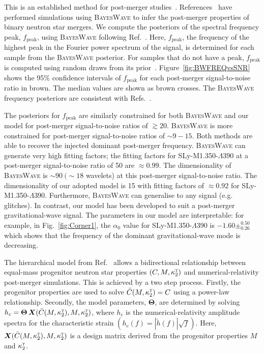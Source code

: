 \documentclass[../Thesis.tex]{subfiles}
\begin{document}
    This is an established method for post-merger studies~\cite{GW170817Properties,GW190425Detection}.
    References~\cite{Chatziioannou2017,Torres-Rivas2019} have performed simulations using \textsc{BayesWave} to infer the post-merger properties of binary neutron star mergers.
    We compute the posteriors of the spectral frequency peak, $f_{\mathrm{peak}}$, using \textsc{BayesWave} following Ref.~\cite{Chatziioannou2017}. Here, $f_{\mathrm{peak}}$, the frequency of the highest peak in the Fourier power spectrum of the signal, is determined for each sample from the \textsc{BayesWave} posterior. 
    For samples that do not have a peak, $f_{\mathrm{peak}}$ is computed using  random draws from its prior~\cite{Chatziioannou2017}.
    Figure~\ref{fig:BWFREQvsSNR} shows the 95\% confidence intervals of $f_{\mathrm{peak}}$ for each post-merger signal-to-noise ratio in brown. The median values are shown as brown crosses.
    The \textsc{BayesWave} frequency posteriors are consistent with Refs.~\cite{Chatziioannou2017,Torres-Rivas2019}.

    The posteriors for $f_{\mathrm{peak}}$ are similarly constrained for both \textsc{BayesWave} and our model for post-merger signal-to-noise ratios of $\gtrsim 20$. 
    \textsc{BayesWave} is more  constrained for post-merger signal-to-noise ratios of $\sim 9 - 15$.
    Both methods are able to recover the injected dominant post-merger frequency.
    \textsc{BayesWave} can generate very high fitting factors; the fitting factors for SLy-M1.350-$\Lambda390$ at a post-merger signal-to-noise ratio of 50 are $\approx 0.99$.
    The dimensionality of \textsc{BayesWave} is $\sim 90\  (\sim 18$ wavelets) at this post-merger signal-to-noise ratio.
    The dimensionality of our adopted model is 15 with fitting factors of $\approx 0.92$ for SLy-M1.350-$\Lambda390$.
    Furthermore, \textsc{BayesWave} can generalise to any signal (e.g. glitches).
    In contrast, our model has been developed to suit a post-merger gravitational-wave signal.
    The parameters in our model are interpretable: 
    for example, in Fig.~\ref{fig:Corner1}, the $\alpha_0$ value for SLy-M1.350-$\Lambda390$ is $-1.60\pm^{0.50}_{0.26}$ which
     shows that the frequency of the dominant gravitational-wave mode is decreasing.

    The hierarchical model from Ref.~\cite{Easter2019} allows a bidirectional relationship between equal-mass progenitor neutron star properties $(C,M,\kappa_2^\textsc{t})$ and numerical-relativity post-merger simulations. 
    This is achieved by a two step process. 
    Firstly, the progenitor properties are used to solve $\bar{C}(M,\kappa_2^\textsc{t})=C$ using a power-law relationship.  
    Secondly, the model parameters, $\boldsymbol{\Theta}$, are determined by solving $h_c = \boldsymbol{\Theta}\, \boldsymbol{X}(\bar{C}(M,\kappa_2^\textsc{t}),M,\kappa_2^\textsc{t})$, where $h_c$ is the numerical-relativity amplitude spectra for the characteristic strain $(h_c(f)=|\tilde{h}(f)|\sqrt{f})$.  
    Here, $\boldsymbol{X}(\bar{C} (M,\kappa_2^\textsc{t}),M,\kappa_2^\textsc{t})$ is a design matrix derived from the progenitor properties $M$ and $\kappa_2^\textsc{t}$.\par
\end{document}
